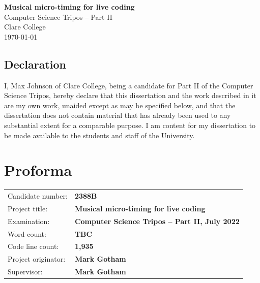 \documentclass[12pt,twoside,openright]{report}
\begin{document}

\begin{titlepage}
    \pagestyle{empty}


    \vspace*{60mm}
    \begin{center}
    \Huge
    \textbf{Musical micro-timing for live coding} \\[5mm]
    Computer Science Tripos -- Part II \\[5mm]
    Clare College \\[5mm]
    \today
    \end{center}
\end{titlepage}


\pagestyle{plain}

\section*{Declaration}

I, Max Johnson of Clare College, being a candidate for Part II of the Computer Science Tripos, hereby declare that this dissertation and the work described in it are my own work, unaided except as may be specified below, and that the dissertation does not contain material that has already been used to any substantial extent for a comparable purpose. I am content for my dissertation to be made available to the students and staff of the University.

\bigskip
{}

\medskip
{}


\newpage
\chapter*{Proforma}

{\large
\begin{tabularx}{\linewidth}{lX}
Candidate number:   & \bf 2388B \\
Project title:      & \bf Musical micro-timing for live coding \\
Examination:        & \bf Computer Science Tripos -- Part II, July 2022  \\
Word count:         & \bf TBC \\
Code line count:    & \bf 1,935\footnotemark[1] \\
Project originator: & \bf Mark Gotham \\
Supervisor:         & \bf Mark Gotham \\
\end{tabularx}
}
\end{document}
